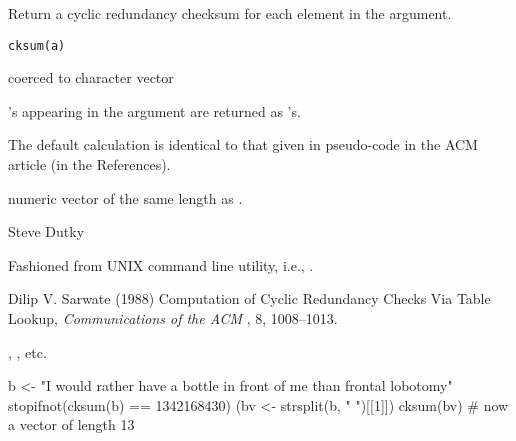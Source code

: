 \begin{Description}\relax
Return a cyclic redundancy checksum for each element in the argument.
\end{Description}
\begin{Usage}
\begin{verbatim}
cksum(a)
\end{verbatim}
\end{Usage}
\begin{Arguments}
\begin{ldescription}
\item[\code{a}] coerced to character vector
\end{ldescription}
\end{Arguments}
\begin{Details}\relax
{}'s appearing in the argument are returned as 's.

The default calculation is identical to that given in pseudo-code in the
ACM article (in the References).
\end{Details}
\begin{Value}
numeric vector of the same length as .
\end{Value}
\begin{Author}\relax
Steve Dutky 
\end{Author}
\begin{References}\relax
Fashioned from  UNIX command line utility, i.e.,
.

Dilip V. Sarwate (1988)
Computation of Cyclic Redundancy Checks Via Table Lookup,
\emph{Communications of the ACM} , 8, 1008--1013.
\end{References}
\begin{SeeAlso}\relax
{}, , etc.
\end{SeeAlso}
\begin{Examples}
\begin{ExampleCode}
   b <- "I would rather have a bottle in front of me than frontal lobotomy\n"
 stopifnot(cksum(b) == 1342168430)
 (bv <- strsplit(b, " ")[[1]])
 cksum(bv) # now a vector of length 13
\end{ExampleCode}
\end{Examples}


